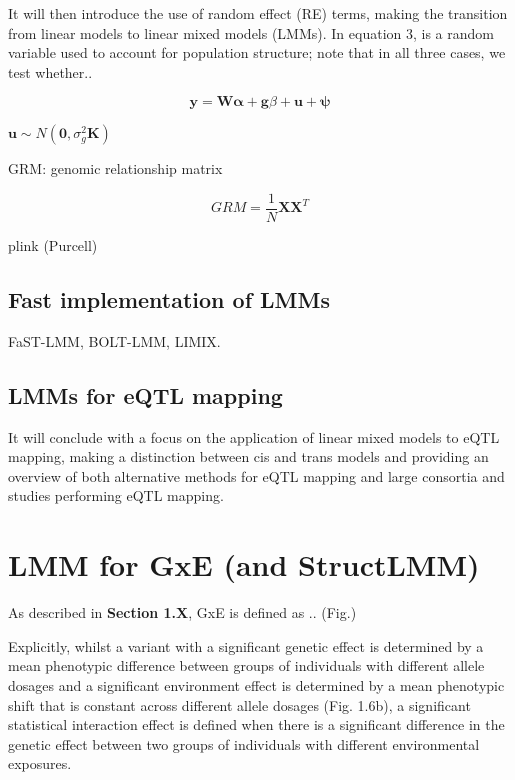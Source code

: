 It will then introduce the use of random effect (RE) terms, making the transition from linear models to linear mixed models (LMMs). 
In equation 3,  is a random variable used to account for population structure; note that in all three cases, we test whether..

\begin{equation}\label{eq22:Linear_mixed_model}
 \mathbf{y} =  \mathbf{W}\boldsymbol{\alpha} + \mathbf{g}\beta + \mathbf{u} + \boldsymbol{\psi} 
\end{equation}

$\mathbf{u} \sim N(\mathbf{0}, \sigma_g^2\mathbf{K})$



GRM: genomic relationship matrix

\begin{equation}
    GRM = \frac{1}{N}\mathbf{X}\mathbf{X}^T
\end{equation}{}

plink (Purcell)

\subsection{Fast implementation of LMMs}

FaST-LMM, BOLT-LMM, LIMIX.


\subsection{LMMs for eQTL mapping}

It will conclude with a focus on the application of linear mixed models to eQTL mapping, making a distinction between cis and trans models and providing an overview of both alternative methods for eQTL mapping and large consortia and studies performing eQTL mapping.


\section{LMM for GxE (and StructLMM)}

As described in \textbf{Section 1.X}, GxE is defined as .. (Fig.)

Explicitly, whilst a variant with a significant genetic effect is determined by a mean phenotypic difference between groups of individuals with different allele dosages and a significant environment effect is determined by a mean phenotypic shift that is constant across different allele dosages (Fig. 1.6b), a significant statistical interaction effect is defined when there is a significant difference in the genetic effect between two groups of individuals with different environmental exposures.

